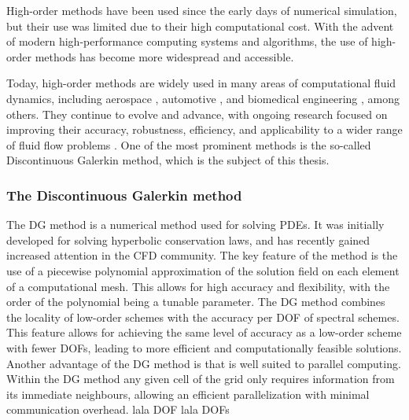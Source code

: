 High-order methods have been used since the early days of numerical simulation, but their use was limited due to their high computational cost. With the advent of modern high-performance computing systems and algorithms, the use of high-order methods has become more widespread and accessible. %

Today, high-order methods are widely used in many areas of computational fluid dynamics, including aerospace \parencite{mavriplisProgessHighOrderDiscontinuous2009}, automotive \parencite{colomboAssessmentDiscontinuousGalerkin2021}, and biomedical engineering \parencite{fehnModernDiscontinuousGalerkin2019}, among others. They continue to evolve and advance, with ongoing research focused on improving their accuracy, robustness, efficiency, and applicability to a wider range of fluid flow problems \parencite{perssonSubCellShockCapturing2006}. One of the most prominent methods is the so-called Discontinuous Galerkin method, which is the subject of this thesis.

\subsubsection{The Discontinuous Galerkin method}
The \gls{DG} method is a numerical method used for solving \glspl{PDE}. It was initially developed for solving hyperbolic conservation laws, and has recently gained increased attention in the \gls{CFD} community. The key feature of the method is the use of a piecewise polynomial approximation of the solution field on each element of a computational mesh. This allows for high accuracy and flexibility, with the order of the polynomial being a tunable parameter. 
The DG method combines the locality of low-order schemes with the accuracy per \gls{DOF} of spectral schemes. This feature allows for achieving the same level of accuracy as a low-order scheme with fewer \glspl{DOF}, leading to more efficient and computationally feasible solutions.  Another advantage of the  DG method is that is well suited to parallel computing. Within the DG method any given cell of the grid only requires information from its immediate neighbours, allowing an efficient parallelization with minimal communication overhead.
lala \gls{DOF} lala \glspl{DOF}

